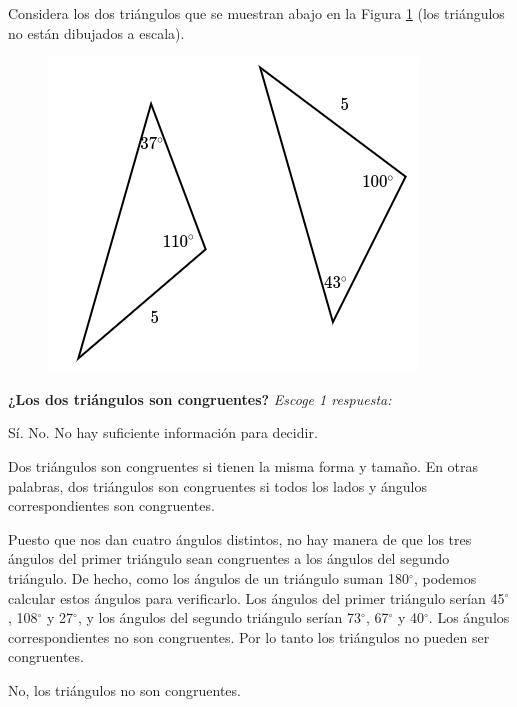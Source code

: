 \question[5] Considera los dos triángulos que se muestran abajo en la Figura \ref{fig:20230323154518} (los triángulos no están dibujados a escala).

\begin{figure}[H]
    \includegraphics[width=0.5\linewidth]{../images/20230323154518}
    \caption{}
    \label{fig:20230323154518}
\end{figure}

\textbf{¿Los dos triángulos son congruentes?}
\emph{Escoge 1 respuesta:}

\begin{choices}
    \choice Sí.
    \CorrectChoice No.
    \choice No hay suficiente información para decidir.
\end{choices}

\begin{solutionbox}{5cm}
    Dos triángulos son congruentes si tienen la misma forma y tamaño. En otras palabras, dos triángulos son congruentes si todos los lados y ángulos correspondientes son congruentes.

    Puesto que nos dan cuatro ángulos distintos, no hay manera de que los tres ángulos del primer triángulo sean congruentes a los ángulos del segundo triángulo.
    De hecho, como los ángulos de un triángulo suman 180$^\circ$, podemos calcular estos ángulos para verificarlo. Los ángulos del primer triángulo serían 45$^\circ$, 108$^\circ$ y 27$^\circ$, y los ángulos del segundo triángulo serían 73$^\circ$, 67$^\circ$ y 40$^\circ$.
    Los ángulos correspondientes no son congruentes. Por lo tanto los triángulos no pueden ser congruentes.

    No, los triángulos no son congruentes.
\end{solutionbox}